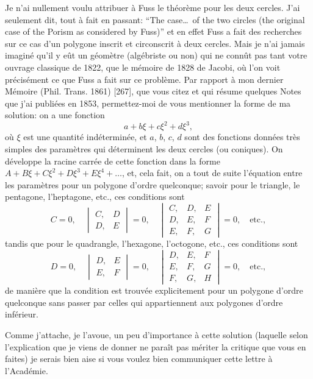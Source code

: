 \documentclass[11pt,a4paper]{article}
\begin{document}
Je n'ai nullement voulu attribuer \`{a} Fuss le th\'{e}or\`{e}me pour les deux cercles. J'ai seulement dit, tout \`{a} fait en passant: ``The case\ldots\ of the two circles (the original case of the Porism as considered by Fuss)'' et en effet Fuss a fait des recherches sur ce cas d'un polygone inscrit et circonscrit \`{a} deux cercles. Mais je n'ai jamais imagin\'{e} qu'il y e\^{u}t un g\'{e}om\`{e}tre (alg\'{e}briste ou non) qui ne conn\^{u}t pas tant votre ouvrage classique de 1822, que le m\'{e}moire de 1828 de Jacobi, o\`{u} l'on voit pr\'{e}cis\'{e}ment ce que Fuss a fait sur ce probl\`{e}me. Par rapport \`{a} mon dernier M\'{e}moire (Phil. Trans. 1861) [267], que vous citez et qui r\'{e}sume quelques Notes que j'ai publi\'{e}es en 1853, permettez-moi de vous mentionner la forme de ma solution: on a une fonction
\[
a + b\xi + c\xi^2 + d\xi^3,
\]
o\`{u} $\xi$ est une quantit\'{e} ind\'{e}termin\'{e}e, et $a$, $b$, $c$, $d$ sont des fonctions donn\'{e}es tr\`{e}s simples des param\`{e}tres qui d\'{e}terminent les deux cercles (ou coniques). On d\'{e}veloppe la racine carr\'{e}e de cette fonction dans la forme $A + B\xi + C\xi^2 + D\xi^3 + E\xi^4 + \ldots$, et, cela fait, on a tout de suite l'\'{e}quation entre les param\`{e}tres pour un polygone d'ordre quelconque; savoir pour le triangle, le pentagone, l'heptagone, etc., ces conditions sont
\[
C = 0, \quad
\begin{vmatrix} C, & D \\ D, & E \end{vmatrix} = 0, \quad
\begin{vmatrix} C, & D, & E \\ D, & E, & F \\ E, & F, & G \end{vmatrix} = 0, \quad \text{etc.},
\]
tandis que pour le quadrangle, l'hexagone, l'octogone, etc., ces conditions sont
\[
D = 0, \quad
\begin{vmatrix} D, & E \\ E, & F \end{vmatrix} = 0, \quad
\begin{vmatrix} D, & E, & F \\ E, & F, & G \\ F, & G, & H \end{vmatrix} = 0, \quad \text{etc.},
\]
de mani\`{e}re que la condition est trouv\'{e}e explicitement pour un polygone d'ordre quelconque sans passer par celles qui appartiennent aux polygones d'ordre inf\'{e}rieur.

Comme j'attache, je l'avoue, un peu d'importance \`{a} cette solution (laquelle selon l'explication que je viens de donner ne para\^{i}t pas m\'{e}riter la critique que vous en faites) je serais bien aise si vous voulez bien communiquer cette lettre \`{a} l'Acad\'{e}mie.
\end{document}
